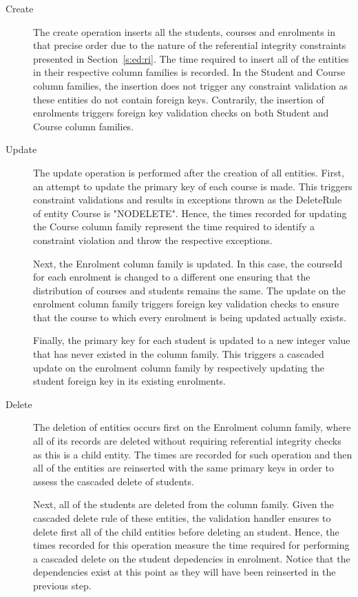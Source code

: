 \begin{description}
\item[Create] The create operation inserts all the students, courses and enrolments in
that precise order due to the nature of the referential integrity constraints
presented in Section~\ref{s:ed:ri}. The time required to insert all of the
entities in their respective column families  is recorded. In the Student and
Course column families, the insertion does not trigger any constraint validation
as these entities do not contain foreign keys. Contrarily, the insertion of
enrolments triggers foreign key validation checks on both Student and Course
column families.
\item[Update] The update operation is performed after the creation of all entities.
First, an attempt to update the primary key of each course is made. This
triggers constraint validations and results in exceptions thrown as the
DeleteRule of entity Course is "NODELETE". Hence, the times recorded for
updating the Course column family represent the time required to identify a
constraint violation and throw the respective exceptions.
			
Next, the Enrolment column family is updated. In this case, the courseId for
each enrolment is changed to a different one ensuring that the distribution of
courses and students remains the same. The update on the enrolment column family
triggers foreign key validation checks to ensure that the course to which every
enrolment is being updated actually exists.
			
Finally, the primary key for each student is updated to a new integer value that
has never existed in the column family. This triggers a cascaded update on the
enrolment column family by respectively updating the student foreign key in its
existing enrolments.
\item[Delete]The deletion of entities occurs first on the Enrolment column family,
where all of its records are deleted without requiring referential integrity
checks as this is a child entity. The times are recorded for such operation and
then all of the entities are reinserted with the same primary keys in order to
assess the cascaded delete of students.
		
Next, all of the students are deleted from the column family. Given the cascaded
delete rule of these entities, the validation handler ensures to delete first
all of the child entities before deleting an student. Hence, the times recorded
for this operation measure the time required for performing a cascaded delete on
the student depedencies in enrolment. Notice that the dependencies exist at this
point as they will have been reinserted in the previous step.
		

\end{description}
